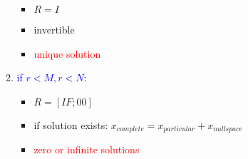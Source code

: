 \documentclass[a4paper,12pt]{article}
\newcommand{\blue}[1]{\textcolor{blue}{#1}}
\newcommand{\red}[1]{\textcolor{red}{#1}}
\begin{document}
\begin{itemize}
\begin{enumerate}
\begin{itemize}
\item $R = I$
\item invertible
\item \red{unique solution}
\end{itemize}
\item \blue{if $r < M, r < N$:}
\begin{itemize}
\item $R = [ I F; 0 0]$
\item if solution exists: $x_{complete} = x_{particular} + x_{nullspace}$
\item \red{zero or infinite solutions}
\end{itemize}
\end{enumerate}
\end{itemize}
\end{document}

